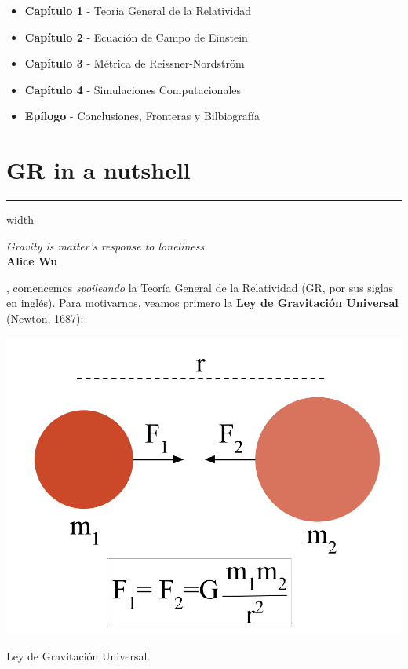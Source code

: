 \begin{remarkbox}{}
\begin{itemize}
    \item \textbf{Capítulo 1} - Teoría General de la Relatividad
    \item \textbf{Capítulo 2} - Ecuación de Campo de Einstein
    \item \textbf{Capítulo 3} - Métrica de Reissner-Nordström
    \item \textbf{Capítulo 4} - Simulaciones Computacionales
    \item \textbf{Epílogo} - Conclusiones, Fronteras y Bilbiografía
\end{itemize}
\end{remarkbox}

\section{\huge{GR in a nutshell}}
\textcolor{myred}{\hrule width\textwidth}

\begin{flushright}
\textit{Gravity is matter's response to loneliness.}\\ \textbf{Alice Wu}
\end{flushright}
, comencemos \textit{spoileando} la Teoría General de la Relatividad (GR, por sus siglas en inglés). Para motivarnos, veamos primero la \textbf{Ley de Gravitación Universal} (Newton, 1687):

\begin{marginfigure}
\captionsetup{type=figure}
    \centering
    \includegraphics[width=1.3\textwidth]{Im/gravuniv.png}
    \caption{Ley de Gravitación Universal.}
    \label{fig:sen}
\end{marginfigure}

